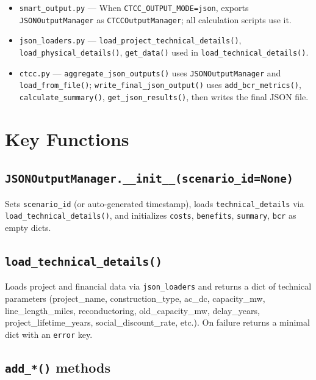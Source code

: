 \documentclass[ctcc_full_documentation.tex]{subfiles}
\begin{document}
\begin{itemize}
    \item \texttt{smart\_output.py} --- When \texttt{CTCC\_OUTPUT\_MODE=json}, exports \texttt{JSONOutputManager} as \texttt{CTCCOutputManager}; all calculation scripts use it.
    \item \texttt{json\_loaders.py} --- \texttt{load\_project\_technical\_details()}, \texttt{load\_physical\_details()}, \texttt{get\_data()} used in \texttt{load\_technical\_details()}.
    \item \texttt{ctcc.py} --- \texttt{aggregate\_json\_outputs()} uses \texttt{JSONOutputManager} and \texttt{load\_from\_file()}; \texttt{write\_final\_json\_output()} uses \texttt{add\_bcr\_metrics()}, \texttt{calculate\_summary()}, \texttt{get\_json\_results()}, then writes the final JSON file.
\end{itemize}

\section{Key Functions}

\subsection{\texttt{JSONOutputManager.\_\_init\_\_(scenario\_id=None)}}

Sets \texttt{scenario\_id} (or auto-generated timestamp), loads \texttt{technical\_details} via \texttt{load\_technical\_details()}, and initializes \texttt{costs}, \texttt{benefits}, \texttt{summary}, \texttt{bcr} as empty dicts.

\subsection{\texttt{load\_technical\_details()}}

Loads project and financial data via \texttt{json\_loaders} and returns a dict of technical parameters (project\_name, construction\_type, ac\_dc, capacity\_mw, line\_length\_miles, reconductoring, old\_capacity\_mw, delay\_years, project\_lifetime\_years, social\_discount\_rate, etc.). On failure returns a minimal dict with an \texttt{error} key.

\subsection{\texttt{add\_*()} methods}
\end{document}
